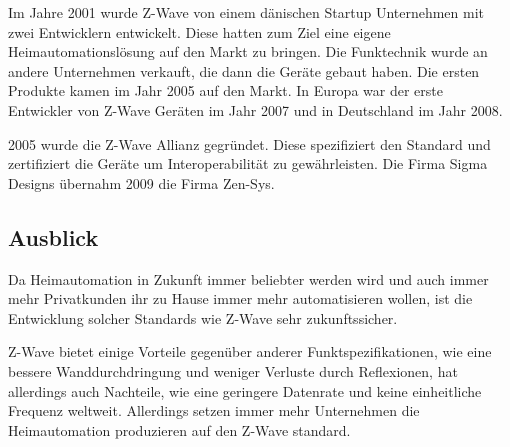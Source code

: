 \begin{multicols}{3}

Im Jahre 2001 wurde Z-Wave von einem dänischen Startup Unternehmen mit zwei Entwicklern entwickelt. Diese hatten zum Ziel eine eigene Heimautomationslösung auf den Markt zu bringen. Die Funktechnik wurde an andere Unternehmen verkauft, die dann die Geräte gebaut haben. Die ersten Produkte kamen im Jahr 2005 auf den Markt. In Europa war der erste Entwickler von Z-Wave Geräten im Jahr 2007 und in Deutschland im Jahr 2008. 

2005 wurde die Z-Wave Allianz gegründet. Diese spezifiziert den Standard und zertifiziert die Geräte um Interoperabilität zu gewährleisten. Die Firma Sigma Designs übernahm 2009 die Firma Zen-Sys.

\subsection*{Ausblick}
Da Heimautomation in Zukunft immer beliebter werden wird und auch immer mehr Privatkunden ihr zu Hause immer mehr automatisieren wollen, ist die Entwicklung solcher Standards wie Z-Wave sehr zukunftssicher. 

Z-Wave bietet einige Vorteile gegenüber anderer Funktspezifikationen, wie eine bessere Wanddurchdringung und weniger Verluste durch Reflexionen, hat allerdings auch Nachteile, wie eine geringere Datenrate und keine einheitliche Frequenz weltweit. Allerdings setzen immer mehr Unternehmen die Heimautomation produzieren auf den Z-Wave standard.
\printbibliography[segment=1,heading=subbibliography]
\end{multicols}

\newpage
